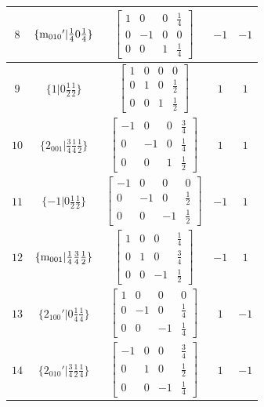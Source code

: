 \documentclass[fleqn,8pt]{jsarticle}
\begin{document}
\begin{longtable}{ccccc}
$ 8 $ & $ \{{\rm m}_{010}{}'|\frac{1}{4} 0 \frac{1}{4}\} $ & $ \begin{bmatrix} 1 & 0 & 0 & \frac{1}{4} \\ 0 & -1 & 0 & 0 \\ 0 & 0 & 1 & \frac{1}{4} \end{bmatrix} $ & $ -1 $ & $ -1 $ \\ \hline
$ 9 $ & $ \{1|0 \frac{1}{2} \frac{1}{2}\} $ & $ \begin{bmatrix} 1 & 0 & 0 & 0 \\ 0 & 1 & 0 & \frac{1}{2} \\ 0 & 0 & 1 & \frac{1}{2} \end{bmatrix} $ & $ 1 $ & $ 1 $ \\ \hline
$ 10 $ & $ \{2{}_{001}|\frac{3}{4} \frac{1}{4} \frac{1}{2}\} $ & $ \begin{bmatrix} -1 & 0 & 0 & \frac{3}{4} \\ 0 & -1 & 0 & \frac{1}{4} \\ 0 & 0 & 1 & \frac{1}{2} \end{bmatrix} $ & $ 1 $ & $ 1 $ \\ \hline
$ 11 $ & $ \{-1|0 \frac{1}{2} \frac{1}{2}\} $ & $ \begin{bmatrix} -1 & 0 & 0 & 0 \\ 0 & -1 & 0 & \frac{1}{2} \\ 0 & 0 & -1 & \frac{1}{2} \end{bmatrix} $ & $ -1 $ & $ 1 $ \\ \hline
$ 12 $ & $ \{{\rm m}_{001}|\frac{1}{4} \frac{3}{4} \frac{1}{2}\} $ & $ \begin{bmatrix} 1 & 0 & 0 & \frac{1}{4} \\ 0 & 1 & 0 & \frac{3}{4} \\ 0 & 0 & -1 & \frac{1}{2} \end{bmatrix} $ & $ -1 $ & $ 1 $ \\ \hline
$ 13 $ & $ \{2{}_{100}{}'|0 \frac{1}{4} \frac{1}{4}\} $ & $ \begin{bmatrix} 1 & 0 & 0 & 0 \\ 0 & -1 & 0 & \frac{1}{4} \\ 0 & 0 & -1 & \frac{1}{4} \end{bmatrix} $ & $ 1 $ & $ -1 $ \\ \hline
$ 14 $ & $ \{2{}_{010}{}'|\frac{3}{4} \frac{1}{2} \frac{1}{4}\} $ & $ \begin{bmatrix} -1 & 0 & 0 & \frac{3}{4} \\ 0 & 1 & 0 & \frac{1}{2} \\ 0 & 0 & -1 & \frac{1}{4} \end{bmatrix} $ & $ 1 $ & $ -1 $ \\ \hline

\end{longtable}
\end{document}
